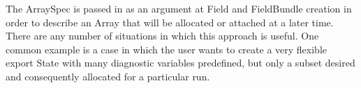 

The ArraySpec is passed in as an argument at Field and 
FieldBundle creation in order to describe an Array that will 
be allocated or attached at a later time.  There are any
number of situations in which this approach is useful.  
One common example is a case in which the user wants to create
a very flexible export State with many diagnostic variables 
predefined, but only a subset desired and consequently 
allocated for a particular run.  



